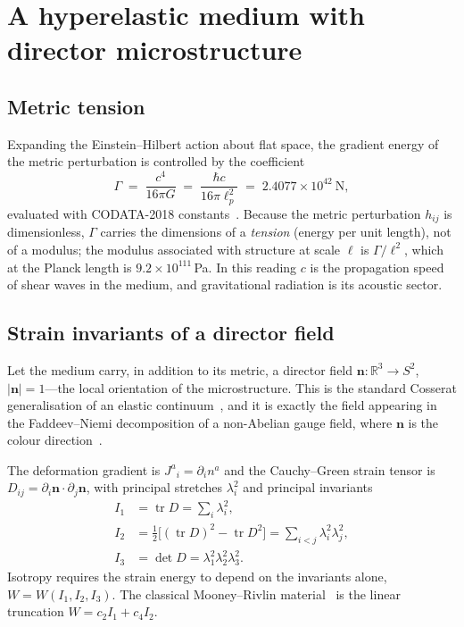 \documentclass[aps,prd,preprint,nofootinbib,longbibliography]{revtex4-2}
\newcommand{\nv}{\bm{n}}
\begin{document}
\section{A hyperelastic medium with director microstructure}
\label{sec:elastic}

\subsection{Metric tension}

Expanding the Einstein--Hilbert action about flat space, the gradient energy of
the metric perturbation is controlled by the coefficient
\begin{equation}
\Gamma \;=\; \frac{c^4}{16\pi G} \;=\; \frac{\hbar c}{16\pi \ell_p^2}
\;=\; 2.4077\times10^{42}\ \mathrm{N},
\label{eq:gamma}
\end{equation}
evaluated with CODATA-2018 constants~\cite{codata2018}. Because the metric
perturbation $h_{ij}$ is dimensionless, $\Gamma$ carries the dimensions of a
\emph{tension} (energy per unit length), not of a modulus; the modulus associated
with structure at scale $\ell$ is $\Gamma/\ell^2$, which at the Planck length is
$9.2\times10^{111}\,$Pa. In this reading $c$ is the propagation speed of shear
waves in the medium, and gravitational radiation is its acoustic sector.

\subsection{Strain invariants of a director field}

Let the medium carry, in addition to its metric, a director field
$\nv:\mathbb{R}^3\to S^2$, $|\nv|=1$---the local orientation of the
microstructure. This is the standard Cosserat generalisation of an elastic
continuum~\cite{cosserat1909}, and it is exactly the field appearing in the
Faddeev--Niemi decomposition of a non-Abelian gauge field, where $\nv$ is the
colour direction~\cite{cho1980,cho1981,faddeev1999}.

The deformation gradient is $J^a{}_i=\partial_i n^a$ and the Cauchy--Green strain
tensor is $D_{ij}=\partial_i\nv\cdot\partial_j\nv$, with principal stretches
$\lambda_i^2$ and principal invariants
\begin{align}
I_1 &= \operatorname{tr}D=\sum_i\lambda_i^2, \nonumber\\
I_2 &= \tfrac12\big[(\operatorname{tr}D)^2-\operatorname{tr}D^2\big]
       =\sum_{i<j}\lambda_i^2\lambda_j^2, \\
I_3 &= \det D=\lambda_1^2\lambda_2^2\lambda_3^2. \nonumber
\end{align}
Isotropy requires the strain energy to depend on the invariants alone,
$W=W(I_1,I_2,I_3)$. The classical Mooney--Rivlin
material~\cite{mooney1940,rivlin1948} is the linear truncation
$W=c_2I_1+c_4I_2$.
\end{document}

